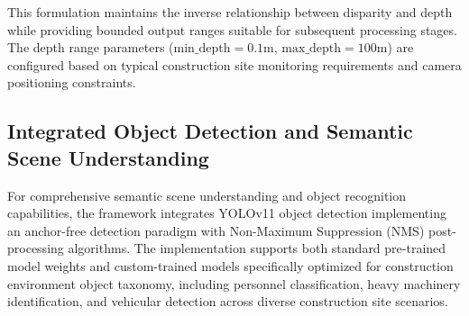 \documentclass{article}
\begin{document}
This formulation maintains the inverse relationship between disparity and depth while providing bounded output ranges suitable for subsequent processing stages. The depth range parameters ($\text{min\_depth} = 0.1$m, $\text{max\_depth} = 100$m) are configured based on typical construction site monitoring requirements and camera positioning constraints.

\subsection{Integrated Object Detection and Semantic Scene Understanding}
For comprehensive semantic scene understanding and object recognition capabilities, the framework integrates YOLOv11 object detection implementing an anchor-free detection paradigm with Non-Maximum Suppression (NMS) post-processing algorithms. The implementation supports both standard pre-trained model weights and custom-trained models specifically optimized for construction environment object taxonomy, including personnel classification, heavy machinery identification, and vehicular detection across diverse construction site scenarios.
\end{document}
